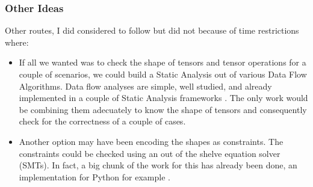 \subsubsection*{Other Ideas}

Other routes, I did considered to follow but did not because of time
restrictions where:

\begin{itemize}
\tightlist
\item
  If all we wanted was to check the shape of tensors and tensor
  operations for a couple of scenarios, we could build a Static Analysis
  out of various Data Flow Algorithms. Data flow analyses are simple,
  well studied, and already implemented in a couple of Static Analysis
  frameworks {}. The only work would be combining them adecuately to know the
  shape of tensors and consequently check for the correctness of a
  couple of cases.
\item
  Another option may have been encoding the shapes as constraints. The
  constraints could be checked using an out of the shelve equation
  solver (SMTs). In fact, a big chunk of the work for this has already
  been done, an implementation for Python for example {}.
\end{itemize}
